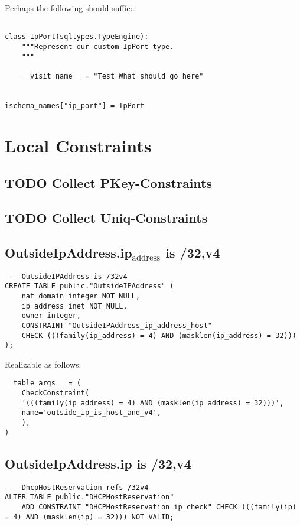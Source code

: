 \documentclass[11pt]{article}
\begin{document}
Perhaps the following should suffice:

\begin{verbatim}

class IpPort(sqltypes.TypeEngine):
    """Represent our custom IpPort type.
    """

    __visit_name__ = "Test What should go here"


ischema_names["ip_port"] = IpPort
\end{verbatim}


\section{Local Constraints}
\label{sec:orgfa17104}
\subsection{{\bfseries\sffamily TODO} Collect PKey-Constraints}
\label{sec:orgd3f65e4}
\subsection{{\bfseries\sffamily TODO} Collect Uniq-Constraints}
\label{sec:org22be777}
\subsection{OutsideIpAddress.ip\(_{\text{address}}\) is /32,v4}
\label{sec:org96d0608}
\begin{verbatim}
--- OutsideIPAddress is /32v4
CREATE TABLE public."OutsideIPAddress" (
    nat_domain integer NOT NULL,
    ip_address inet NOT NULL,
    owner integer,
    CONSTRAINT "OutsideIPAddress_ip_address_host"
	CHECK (((family(ip_address) = 4) AND (masklen(ip_address) = 32)))
);
\end{verbatim}

Realizable as follows:

\begin{verbatim}
__table_args__ = (
    CheckConstraint(
	'(((family(ip_address) = 4) AND (masklen(ip_address) = 32)))',
	name='outside_ip_is_host_and_v4',
    ),
)
\end{verbatim}

\subsection{OutsideIpAddress.ip is /32,v4}
\label{sec:org48d8c21}
\begin{verbatim}
--- DhcpHostReservation refs /32v4
ALTER TABLE public."DHCPHostReservation"
    ADD CONSTRAINT "DHCPHostReservation_ip_check" CHECK (((family(ip) = 4) AND (masklen(ip) = 32))) NOT VALID;
\end{verbatim}
\end{document}
